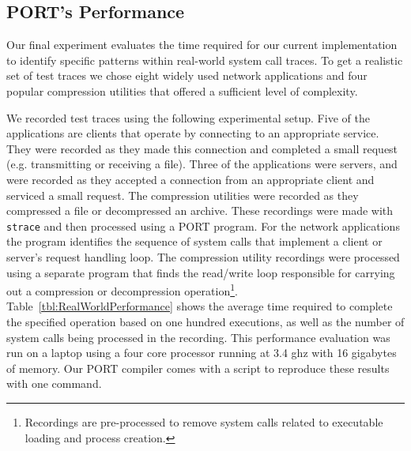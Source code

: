 \subsection{PORT's Performance}

Our final experiment evaluates the
time required for our current implementation
to identify specific
patterns within real-world system call traces.
To get a realistic set of test traces
we chose
eight widely used network applications 
and four popular compression utilities that 
offered a sufficient level of complexity. 

We recorded test traces using the following 
experimental setup. Five of the applications are clients that operate by connecting to an appropriate service. They were recorded as they made this connection and completed a small request (e.g. transmitting or receiving a file).
Three of the applications were servers, and were recorded as they accepted a connection from an appropriate client and serviced a small request.
The compression utilities were recorded as they compressed a file or decompressed an archive.
These recordings were made with {\tt strace}
and then processed using a PORT program.
For the network applications the program
identifies the sequence of system calls that implement
a client or server's request handling loop.
The compression utility recordings were processed using a separate
program that finds the read/write loop responsible for
carrying out a compression or decompression operation\footnote{Recordings are pre-processed to remove system calls
related to executable loading and process creation.}.  Table~\ref{tbl:RealWorldPerformance}
shows the average time required to complete the specified operation
based on one hundred executions, as well as the number of system calls being processed in the recording.  This performance evaluation was run on a laptop using a four core processor running at 3.4 ghz with 16 gigabytes of memory.
Our PORT compiler comes with a script to reproduce these results with one command.

